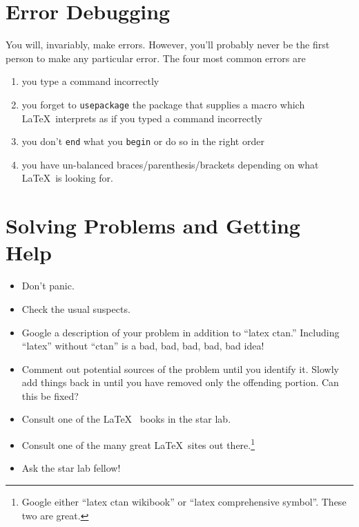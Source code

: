 \section{Error Debugging}

You will, invariably, make errors. However, you'll probably never be
the first person to make any particular error. The four most common
errors are
\begin{enumerate}
\item you type a command incorrectly
\item you forget to \texttt{usepackage} the package that supplies a
  macro which \LaTeX~interprets as if you typed a command incorrectly
\item you don't \texttt{end} what you \texttt{begin} or do so in the
  right order
\item you have un-balanced braces/parenthesis/brackets depending on
  what \LaTeX~is looking for.
\end{enumerate} 


\section{Solving Problems and Getting Help}
\begin{itemize}
\item Don't panic.
\item Check the usual suspects.
\item Google a description of your problem in addition to ``latex
  ctan.'' Including ``latex'' without ``ctan'' is a bad, bad, bad,
  bad, bad idea!
\item Comment out potential sources of the problem until you
  identify it. Slowly add things back in until you have removed only
  the offending portion. Can this be fixed?
\item Consult one of the \LaTeX~ books in the star lab.
\item Consult one of the many great \LaTeX~sites out
  there.\footnote{Google either ``latex ctan wikibook'' or ``latex
    comprehensive symbol''. These two are great.}
\item Ask the star lab fellow!
\end{itemize}



% 

